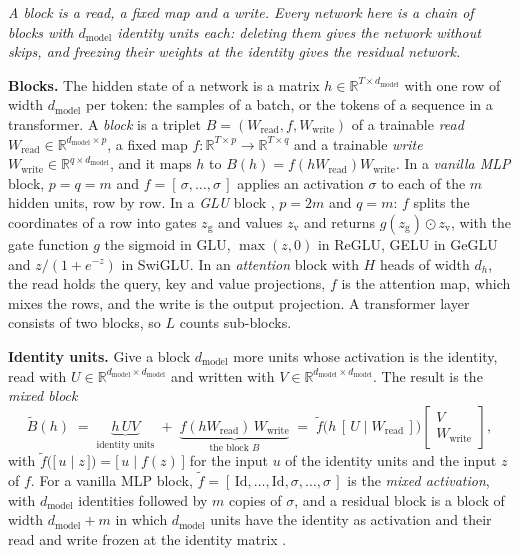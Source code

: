 \documentclass[10pt]{article}
\theoremstyle{definition}
\theoremstyle{remark}
\newcommand{\R}{\mathbb{R}}
\newcommand{\Wread}{W_{\mathrm{read}}}
\newcommand{\Wwrite}{W_{\mathrm{write}}}
\newcommand{\dm}{d_{\mathrm{model}}}
\newcommand{\para}[1]{\smallskip\noindent\textbf{#1}\hspace{0.5em}}
\newcommand{\takeaway}[1]{\noindent\textit{#1}\par\smallskip}
\begin{document}
\takeaway{A block is a read, a fixed map and a write. Every network here is a chain of blocks with $\dm$ identity units each: deleting them gives the network without skips, and freezing their weights at the identity gives the residual network.}

\para{Blocks.} The hidden state of a network is a matrix $h \in \R^{T\times \dm}$ with one row of width $\dm$ per token: the samples of a batch, or the tokens of a sequence in a transformer. A \emph{block} is a triplet $B = (\Wread, f, \Wwrite)$ of a trainable \emph{read} $\Wread \in \R^{\dm\times p}$, a fixed map $f : \R^{T\times p} \to \R^{T\times q}$ and a trainable \emph{write} $\Wwrite \in \R^{q\times \dm}$, and it maps $h$ to $B(h) = f(h\Wread)\Wwrite$. In a \emph{vanilla MLP} block, $p = q = m$ and $f = [\,\sigma, \dots, \sigma\,]$ applies an activation $\sigma$ to each of the $m$ hidden units, row by row. In a \emph{GLU} block \citep{shazeer2020glu}, $p = 2m$ and $q = m$: $f$ splits the coordinates of a row into gates $z_{\mathrm g}$ and values $z_{\mathrm v}$ and returns $g(z_{\mathrm g}) \odot z_{\mathrm v}$, with the gate function $g$ the sigmoid in GLU, $\max(z, 0)$ in ReGLU, GELU in GeGLU and $z/(1 + e^{-z})$ in SwiGLU. In an \emph{attention} block with $H$ heads of width $d_h$, the read holds the query, key and value projections, $f$ is the attention map, which mixes the rows, and the write is the output projection. A transformer layer consists of two blocks, so $L$ counts sub-blocks.

\para{Identity units.} Give a block $\dm$ more units whose activation is the identity, read with $U \in \R^{\dm\times \dm}$ and written with $V \in \R^{\dm\times \dm}$. The result is the \emph{mixed block}
\begin{equation}\label{eq:mixed}
\tilde B(h) \;=\; \underbrace{h\,U V}_{\text{identity units}} \;+\; \underbrace{f(h\Wread)\,\Wwrite}_{\text{the block } B} \;=\; \tilde f\big(h\,[\,U \mid \Wread\,]\big)\begin{bmatrix} V \\ \Wwrite \end{bmatrix},
\end{equation}
with $\tilde f\big(\big[\, u \;\big|\; z \,\big]\big) = \big[\, u \;\big|\; f(z) \,\big]$ for the input $u$ of the identity units and the input $z$ of $f$. For a vanilla MLP block, $\tilde f = [\,\mathrm{Id}, \dots, \mathrm{Id}, \sigma, \dots, \sigma\,]$ is the \emph{mixed activation}, with $\dm$ identities followed by $m$ copies of $\sigma$, and a residual block is a block of width $\dm + m$ in which $\dm$ units have the identity as activation and their read and write frozen at the identity matrix \citep[Section~4]{lin2018resnet}.
\end{document}
